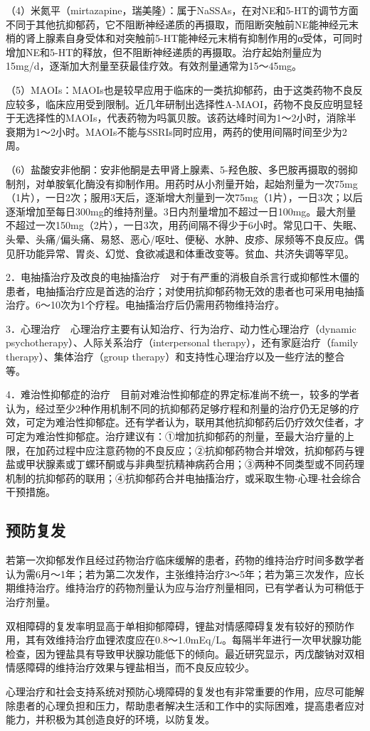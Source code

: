 （4）米氮平（mirtazapine，瑞美隆）：属于NaSSAs，在对NE和5-HT的调节方面不同于其他抗抑郁药，它不阻断神经递质的再摄取，而阻断突触前NE能神经元末梢的肾上腺素自身受体和对突触前5-HT能神经元末梢有抑制作用的α受体，可同时增加NE和5-HT的释放，但不阻断神经递质的再摄取。治疗起始剂量应为15mg/d，逐渐加大剂量至获最佳疗效。有效剂量通常为15～45mg。

（5）MAOIs：MAOIs也是较早应用于临床的一类抗抑郁药，由于这类药物不良反应较多，临床应用受到限制。近几年研制出选择性A-MAOI，药物不良反应明显轻于无选择性的MAOIs，代表药物为吗氯贝胺。该药达峰时间为1～2小时，消除半衰期为1～2小时。MAOIs不能与SSRIs同时应用，两药的使用间隔时间至少为2周。

（6）盐酸安非他酮：安非他酮是去甲肾上腺素、5-羟色胺、多巴胺再摄取的弱抑制剂，对单胺氧化酶没有抑制作用。用药时从小剂量开始，起始剂量为一次75mg（1片），一日2次；服用3天后，逐渐增大剂量到一次75mg（1片），一日3次；以后逐渐增加至每日300mg的维持剂量。3日内剂量增加不超过一日100mg。最大剂量不超过一次150mg（2片），一日3次，用药间隔不得少于6小时。常见口干、失眠、头晕、头痛/偏头痛、易怒、恶心/呕吐、便秘、水肿、皮疹、尿频等不良反应。偶见肝功能异常、胃炎、幻觉、食欲减退和体重改变等。贫血、共济失调等罕见。

2．电抽搐治疗及改良的电抽搐治疗　对于有严重的消极自杀言行或抑郁性木僵的患者，电抽搐治疗应是首选的治疗；对使用抗抑郁药物无效的患者也可采用电抽搐治疗。6～10次为1个疗程。电抽搐治疗后仍需用药物维持治疗。

3．心理治疗　心理治疗主要有认知治疗、行为治疗、动力性心理治疗（dynamic
psychotherapy）、人际关系治疗（interpersonal
therapy），还有家庭治疗（family therapy）、集体治疗（group
therapy）和支持性心理治疗以及一些疗法的整合等。

4．难治性抑郁症的治疗　目前对难治性抑郁症的界定标准尚不统一，较多的学者认为，经过至少2种作用机制不同的抗抑郁药足够疗程和剂量的治疗仍无足够的疗效，可定为难治性抑郁症。还有学者认为，联用其他抗抑郁药后仍疗效欠佳者，才可定为难治性抑郁症。治疗建议有：①增加抗抑郁药的剂量，至最大治疗量的上限，在加药过程中应注意药物的不良反应；②抗抑郁药物合并增效，抗抑郁药与锂盐或甲状腺素或丁螺环酮或与非典型抗精神病药合用；③两种不同类型或不同药理机制的抗抑郁药的联用；④抗抑郁药合并电抽搐治疗，或采取生物-心理-社会综合干预措施。

\subsection{预防复发}

若第一次抑郁发作且经过药物治疗临床缓解的患者，药物的维持治疗时间多数学者认为需6月～1年；若为第二次发作，主张维持治疗3～5年；若为第三次发作，应长期维持治疗。维持治疗的药物剂量认为应与治疗剂量相同，已有学者认为可稍低于治疗剂量。

双相障碍的复发率明显高于单相抑郁障碍，锂盐对情感障碍复发有较好的预防作用，其有效维持治疗血锂浓度应在0.8～1.0mEq/L。每隔半年进行一次甲状腺功能检查，因为锂盐具有导致甲状腺功能低下的倾向。最近研究显示，丙戊酸钠对双相情感障碍的维持治疗效果与锂盐相当，而不良反应较少。

心理治疗和社会支持系统对预防心境障碍的复发也有非常重要的作用，应尽可能解除患者的心理负担和压力，帮助患者解决生活和工作中的实际困难，提高患者应对能力，并积极为其创造良好的环境，以防复发。